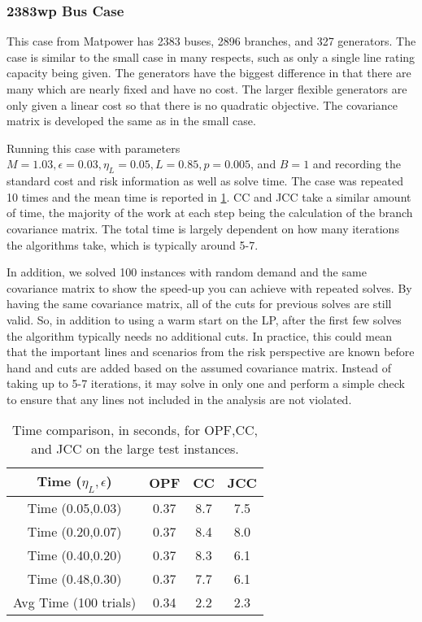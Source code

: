 \subsubsection*{2383wp Bus Case}
This case from Matpower has 2383 buses, 2896 branches, and 327 generators.  The case is similar to the small case in many respects, such as only a single line rating capacity being given.  The generators have the biggest difference in that there are many which are nearly fixed and have no cost.  The larger flexible generators are only given a linear cost so that there is no quadratic objective.  The covariance matrix is developed the same as in the small case.

Running this case with parameters $M=1.03, \epsilon=0.03, \eta_L=0.05, L=0.85, p=0.005$, and $B=1$ and recording the standard cost and risk information as well as solve time.  The case was repeated 10 times and the mean time is reported in \ref{solve_time}.  CC and JCC take a similar amount of time, the majority of the work at each step being the calculation of the branch covariance matrix.  The total time is largely dependent on how many iterations the algorithms take, which is typically around 5-7. 

In addition, we solved 100 instances with random demand and the same covariance matrix to show the speed-up you can achieve with repeated solves.  By having the same covariance matrix, all of the cuts for previous solves are still valid.  So, in addition to using a warm start on the LP, after the first few solves the algorithm typically needs no additional cuts.  In practice, this could mean that the important lines and scenarios from the risk perspective are known before hand and cuts are added based on the assumed covariance matrix.  Instead of taking up to 5-7 iterations, it may solve in only one and perform a simple check to ensure that any lines not included in the analysis are not violated.

\begin{table}
\centering
\begin{tabular}{| c| c c c| }
\hline
Time ($\eta_L,\epsilon$) & OPF & CC & JCC \\
\hline
\hline
Time (0.05,0.03)& 0.37  & 8.7 & 7.5 \\
Time (0.20,0.07)& 0.37  & 8.4 & 8.0 \\
Time (0.40,0.20)& 0.37  & 8.3 & 6.1 \\
Time (0.48,0.30)& 0.37  & 7.7 & 6.1 \\
\hline
\hline
Avg Time (100 trials)& 0.34  & 2.2 & 2.3 \\
\hline
\end{tabular}
\caption{Time comparison, in seconds, for OPF,CC, and JCC on the large test instances.}\label{solve_time}
\end{table}

